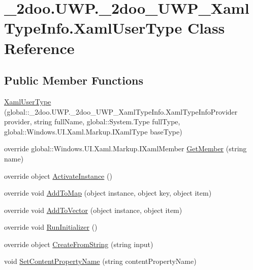 \hypertarget{class__2doo_1_1_u_w_p_1_1__2doo___u_w_p___xaml_type_info_1_1_xaml_user_type}{
\section{\_\-2doo.UWP.\_\-2doo\_\-UWP\_\-XamlTypeInfo.XamlUserType Class Reference}
\label{class__2doo_1_1_u_w_p_1_1__2doo___u_w_p___xaml_type_info_1_1_xaml_user_type}
}
\subsection*{Public Member Functions}
\begin{CompactItemize}
\item 
\hyperlink{class__2doo_1_1_u_w_p_1_1__2doo___u_w_p___xaml_type_info_1_1_xaml_user_type_60424f36d4f7ce95134441bf4ed6a759}{XamlUserType} (global::\_\-2doo.UWP.\_\-2doo\_\-UWP\_\-XamlTypeInfo.XamlTypeInfoProvider provider, string fullName, global::System.Type fullType, global::Windows.UI.Xaml.Markup.IXamlType baseType)
\item 
override global::Windows.UI.Xaml.Markup.IXamlMember \hyperlink{class__2doo_1_1_u_w_p_1_1__2doo___u_w_p___xaml_type_info_1_1_xaml_user_type_a8245789e313c64bc2c8575e2fd66dbb}{GetMember} (string name)
\item 
override object \hyperlink{class__2doo_1_1_u_w_p_1_1__2doo___u_w_p___xaml_type_info_1_1_xaml_user_type_d1544459aab36824fcdc51b0a0150cfd}{ActivateInstance} ()
\item 
override void \hyperlink{class__2doo_1_1_u_w_p_1_1__2doo___u_w_p___xaml_type_info_1_1_xaml_user_type_5211e893a0e0b5da3e33af22ee24dcdb}{AddToMap} (object instance, object key, object item)
\item 
override void \hyperlink{class__2doo_1_1_u_w_p_1_1__2doo___u_w_p___xaml_type_info_1_1_xaml_user_type_1c07d6c6feef7aa2b0e63b5dd9be9a13}{AddToVector} (object instance, object item)
\item 
override void \hyperlink{class__2doo_1_1_u_w_p_1_1__2doo___u_w_p___xaml_type_info_1_1_xaml_user_type_a3ea95ddf1e2048d54bb568ab67e7165}{RunInitializer} ()
\item 
override object \hyperlink{class__2doo_1_1_u_w_p_1_1__2doo___u_w_p___xaml_type_info_1_1_xaml_user_type_7db1396b8a749cba22b5d726ee00804d}{CreateFromString} (string input)
\item 
void \hyperlink{class__2doo_1_1_u_w_p_1_1__2doo___u_w_p___xaml_type_info_1_1_xaml_user_type_304c8165de860be8014192352b4855b1}{SetContentPropertyName} (string contentPropertyName)

\end{CompactItemize}
